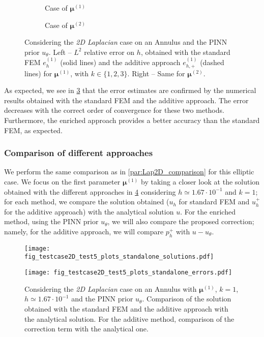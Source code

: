 \begin{figure}[H]
	\centering
	\begin{subfigure}{0.48\linewidth}
		\centering
		\caption{Case of $\bm{\mu}^{(1)}$}
		\label{fig:case4param1}
	\end{subfigure}
	\begin{subfigure}{0.48\linewidth}
		\centering
		\caption{Case of $\bm{\mu}^{(2)}$}
		\label{fig:case4param2}
	\end{subfigure}
	\caption{Considering the \textit{2D Laplacian} case on an Annulus and the PINN prior $u_\theta$. Left -- $L^2$ relative error on $h$, obtained with the standard FEM $e_h^{(1)}$ (solid lines) and the additive approach $e_{h,+}^{(1)}$ (dashed lines) for $\bm{\mu}^{(1)}$, with $k \in \{1,2,3\}$. Right -- Same for $\bm{\mu}^{(2)}$.}
	\label{fig:case5}
\end{figure}

As expected, we see in \cref{fig:case5} that the error estimates are confirmed by the numerical results obtained with the standard FEM and the additive approach. The error decreases with the correct order of convergence for these two methods. Furthermore, the enriched approach provides a better accuracy than the standard FEM, as expected.

\subsubsection{Comparison of different approaches}\label{sec:Lap2DAnn_comparison}

We perform the same comparison as in \cref{par:Lap2D_comparison} for this elliptic case. We focus on the first parameter $\bm{\mu}^{(1)}$ by taking a closer look at the solution obtained with the different approaches in \cref{fig:case5_2D_plots} considering $h\simeq 1.67\cdot 10^{-1}$ and $k=1$; for each method, we compare the solution obtained ($u_h$ for standard FEM and $u_h^+$ for the additive approach) with the analytical solution $u$. For the enriched method, using the PINN prior $u_\theta$, we will also compare the proposed correction; namely, for the additive approach, we will compare $p_h^+$ with $u-u_\theta$.

\begin{figure}[!ht] \centering

    \texttt{[image: fig\_testcase2D\_test5\_plots\_standalone\_solutions.pdf]}

    \texttt{[image: fig\_testcase2D\_test5\_plots\_standalone\_errors.pdf]}

	\caption{Considering the \textit{2D Laplacian} case on an Annulus with $\bm{\mu}^{(1)}$, $k=1$, $h\simeq 1.67\cdot 10^{-1}$ and the PINN prior $u_\theta$. Comparison of the solution obtained with the standard FEM and the additive approach with the analytical solution. For the additive method, comparison of the correction term with the analytical one.}
	\label{fig:case5_2D_plots}
\end{figure}

